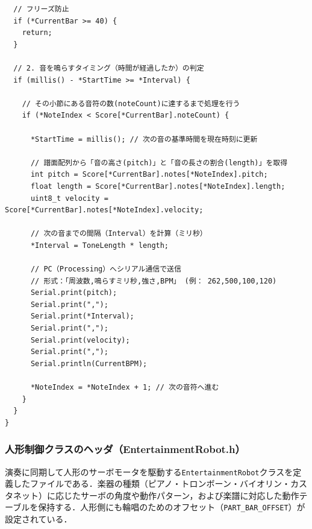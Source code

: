 \begin{lstlisting}
  // フリーズ防止
  if (*CurrentBar >= 40) {
    return; 
  }

  // 2. 音を鳴らすタイミング（時間が経過したか）の判定
  if (millis() - *StartTime >= *Interval) {
    
    // その小節にある音符の数(noteCount)に達するまで処理を行う
    if (*NoteIndex < Score[*CurrentBar].noteCount) {
      
      *StartTime = millis(); // 次の音の基準時間を現在時刻に更新
      
      // 譜面配列から「音の高さ(pitch)」と「音の長さの割合(length)」を取得
      int pitch = Score[*CurrentBar].notes[*NoteIndex].pitch;
      float length = Score[*CurrentBar].notes[*NoteIndex].length;
      uint8_t velocity = Score[*CurrentBar].notes[*NoteIndex].velocity;
      
      // 次の音までの間隔（Interval）を計算（ミリ秒）
      *Interval = ToneLength * length;
      
      // PC（Processing）へシリアル通信で送信
      // 形式：「周波数,鳴らすミリ秒,強さ,BPM」 (例： 262,500,100,120)
      Serial.print(pitch);
      Serial.print(",");
      Serial.print(*Interval);
      Serial.print(",");
      Serial.print(velocity);
      Serial.print(",");
      Serial.println(CurrentBPM);
      
      *NoteIndex = *NoteIndex + 1; // 次の音符へ進む
    }
  }
}

\end{lstlisting}

\subsubsection{人形制御クラスのヘッダ（EntertainmentRobot.h）}
演奏に同期して人形のサーボモータを駆動する\texttt{EntertainmentRobot}クラスを定義したファイルである．楽器の種類（ピアノ・トロンボーン・バイオリン・カスタネット）に応じたサーボの角度や動作パターン，および楽譜に対応した動作テーブルを保持する．人形側にも輪唱のためのオフセット（\texttt{PART\_BAR\_OFFSET}）が設定されている．


